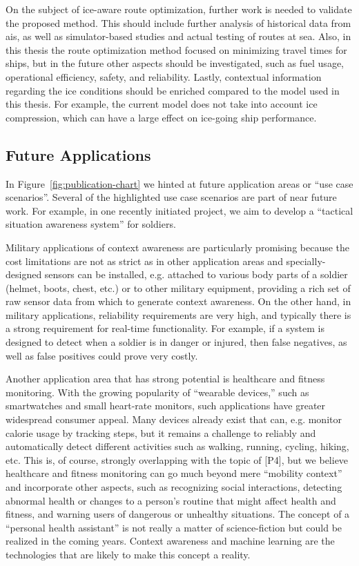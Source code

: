 On the subject of ice-aware route optimization, further work is needed to validate the proposed method. This should include further analysis of historical data from \gls{ais}, as well as simulator-based studies and actual testing of routes at sea. Also, in this thesis the route optimization method focused on minimizing travel times for ships, but in the future other aspects should be investigated, such as fuel usage, operational efficiency, safety, and reliability. Lastly, contextual information regarding the ice conditions should be enriched compared to the model used in this thesis. For example, the current model does not take into account ice compression, which can have a large effect on ice-going ship performance.
%
\subsection{Future Applications}
\label{sec:future_applications}

In Figure~\ref{fig:publication-chart} we hinted at future application areas or ``use case scenarios''. Several of the highlighted use case scenarios are part of near future work. For example, in one recently initiated project, we aim to develop a ``tactical situation awareness system'' for soldiers.

Military applications of context awareness are particularly promising because the cost limitations are not as strict as in other application areas and specially-designed sensors can be installed, e.g. attached to various body parts of a soldier (helmet, boots, chest, etc.) or to other military equipment, providing a rich set of raw sensor data from which to generate context awareness. On the other hand, in military applications, reliability requirements are very high, and typically there is a strong requirement for real-time functionality. For example, if a system is designed to detect when a soldier is in danger or injured, then false negatives, as well as false positives could prove very costly.

Another application area that has strong potential is healthcare and fitness monitoring. With the growing popularity of ``wearable devices,'' such as smartwatches and small heart-rate monitors, such applications have greater widespread consumer appeal. Many devices already exist that can, e.g. monitor calorie usage by tracking steps, but it remains a challenge to reliably and automatically detect different activities such as walking, running, cycling, hiking, etc. This is, of course, strongly overlapping with the topic of [P4], but we believe healthcare and fitness monitoring can go much beyond mere ``mobility context'' and incorporate other aspects, such as recognizing social interactions, detecting abnormal health or changes to a person's routine that might affect health and fitness, and warning users of dangerous or unhealthy situations. The concept of a ``personal health assistant'' is not really a matter of science-fiction but could be realized in the coming years. Context awareness and machine learning are the technologies that are likely to make this concept a reality.

